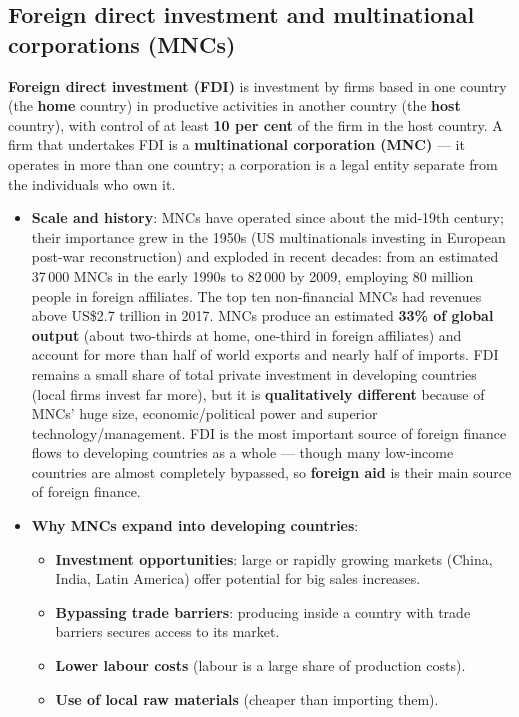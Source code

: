 \documentclass[a4paper,12pt]{article}
\newcommand{\needbold}[1]{\textcolor{red!70!black}{\textbf{#1}}}
\begin{document}
\subsection{Foreign direct investment and multinational corporations (MNCs)}
\needbold{Foreign direct investment (FDI)} is investment by firms based in one country (the \textbf{home} country) in productive activities in another country (the \textbf{host} country), with control of at least \textbf{10 per cent} of the firm in the host country. A firm that undertakes FDI is a \needbold{multinational corporation (MNC)} --- it operates in more than one country; a corporation is a legal entity separate from the individuals who own it.
\begin{itemize}
  \item \textbf{Scale and history}: MNCs have operated since about the mid-19th century; their importance grew in the 1950s (US multinationals investing in European post-war reconstruction) and exploded in recent decades: from an estimated 37\,000 MNCs in the early 1990s to 82\,000 by 2009, employing 80 million people in foreign affiliates. The top ten non-financial MNCs had revenues above US\$2.7 trillion in 2017. MNCs produce an estimated \textbf{33\% of global output} (about two-thirds at home, one-third in foreign affiliates) and account for more than half of world exports and nearly half of imports. FDI remains a small share of total private investment in developing countries (local firms invest far more), but it is \textbf{qualitatively different} because of MNCs' huge size, economic/political power and superior technology/management. FDI is the most important source of foreign finance flows to developing countries as a whole --- though many low-income countries are almost completely bypassed, so \textbf{foreign aid} is their main source of foreign finance.
  \item \textbf{Why MNCs expand into developing countries}:
  \begin{itemize}
    \item \textbf{Investment opportunities}: large or rapidly growing markets (China, India, Latin America) offer potential for big sales increases.
    \item \textbf{Bypassing trade barriers}: producing inside a country with trade barriers secures access to its market.
    \item \textbf{Lower labour costs} (labour is a large share of production costs).
    \item \textbf{Use of local raw materials} (cheaper than importing them).

\end{itemize}
\end{itemize}
\end{document}
